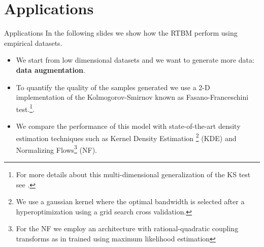 \documentclass[10pt]{beamer}
\begin{document}
\section{Applications}

\begin{frame}{Applications}
In the following slides we show how the RTBM perform using empirical datasets.


\begin{itemize}
    \setlength\itemsep{1em}
    \item[\faArrowRight] We start from low dimensional datasets and we want to generate more data: 
    \textbf{data augmentation}.
    
    \item[\faArrowRight]To quantify the quality of the samples generated we use a 2-D implementation of the
    Kolmogorov-Smirnov known as Fasano-Franceschini test.\footnote{For more details about
    this multi-dimensional generalization of the KS test see \cite{fasano}.}.
    \item[\faArrowRight] We compare the performance of this model with state-of-the-art density
    estimation techniques such as Kernel Density Estimation
    \footnote{We use a gaussian kernel where the optimal bandwidth is selected after a hyperoptimization
    using a grid search cross validation.} (KDE) and Normalizing Flows\footnote{For
    the NF we employ an architecture with rational-quadratic coupling transforms as in \cite{nflow}
    trained using maximum likelihood estimation} (NF).
\end{itemize}







\end{frame}
\end{document}
